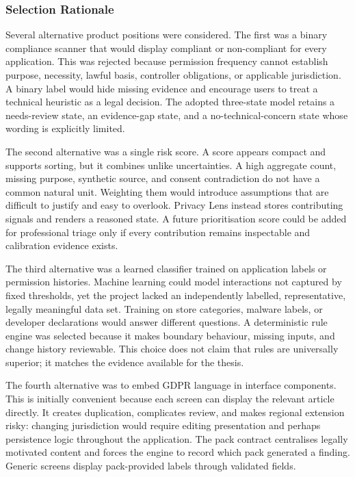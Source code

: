\subsubsection{Selection Rationale}

Several alternative product positions were considered. The first was a binary compliance scanner that would display compliant or non-compliant for every application. This was rejected because permission frequency cannot establish purpose, necessity, lawful basis, controller obligations, or applicable jurisdiction. A binary label would hide missing evidence and encourage users to treat a technical heuristic as a legal decision. The adopted three-state model retains a needs-review state, an evidence-gap state, and a no-technical-concern state whose wording is explicitly limited.

The second alternative was a single risk score. A score appears compact and supports sorting, but it combines unlike uncertainties. A high aggregate count, missing purpose, synthetic source, and consent contradiction do not have a common natural unit. Weighting them would introduce assumptions that are difficult to justify and easy to overlook. Privacy Lens instead stores contributing signals and renders a reasoned state. A future prioritisation score could be added for professional triage only if every contribution remains inspectable and calibration evidence exists.

The third alternative was a learned classifier trained on application labels or permission histories. Machine learning could model interactions not captured by fixed thresholds, yet the project lacked an independently labelled, representative, legally meaningful data set. Training on store categories, malware labels, or developer declarations would answer different questions. A deterministic rule engine was selected because it makes boundary behaviour, missing inputs, and change history reviewable. This choice does not claim that rules are universally superior; it matches the evidence available for the thesis.

The fourth alternative was to embed GDPR language in interface components. This is initially convenient because each screen can display the relevant article directly. It creates duplication, complicates review, and makes regional extension risky: changing jurisdiction would require editing presentation and perhaps persistence logic throughout the application. The pack contract centralises legally motivated content and forces the engine to record which pack generated a finding. Generic screens display pack-provided labels through validated fields.

